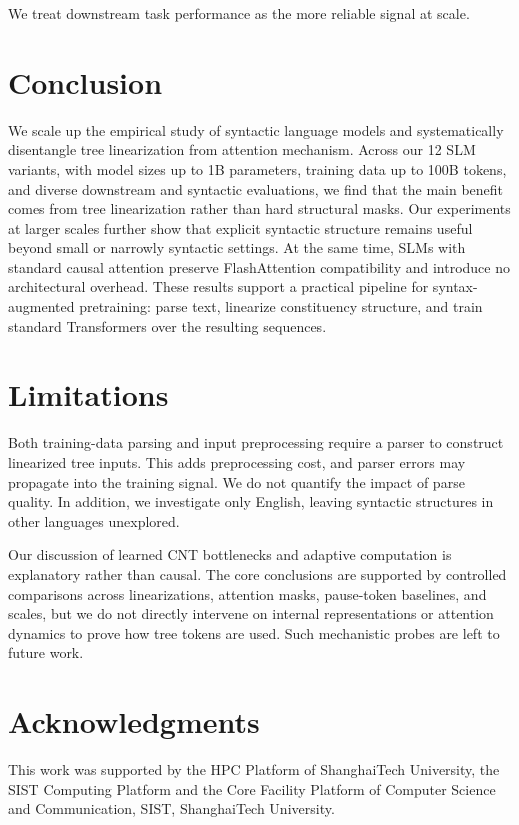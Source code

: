 \documentclass[11pt]{article}
\begin{document}
We treat downstream task performance as the more reliable signal at scale.

\section{Conclusion}

We scale up the empirical study of syntactic language models and systematically disentangle tree linearization from attention mechanism. Across our 12 SLM variants, with model sizes up to 1B parameters, training data up to 100B tokens, and diverse downstream and syntactic evaluations, we find that the main benefit comes from tree linearization rather than hard structural masks. Our experiments at larger scales further show that explicit syntactic structure remains useful beyond small or narrowly syntactic settings. At the same time, SLMs with standard causal attention preserve FlashAttention compatibility and introduce no architectural overhead. These results support a practical pipeline for syntax-augmented pretraining: parse text, linearize constituency structure, and train standard Transformers over the resulting sequences.



\section*{Limitations}

Both training-data parsing and input preprocessing require a parser to construct linearized tree inputs. This adds preprocessing cost, and parser errors may propagate into the training signal. We do not quantify the impact of parse quality. In addition, we investigate only English, leaving syntactic structures in other languages unexplored.

Our discussion of learned CNT bottlenecks and adaptive computation is explanatory rather than causal. The core conclusions are supported by controlled comparisons across linearizations, attention masks, pause-token baselines, and scales, but we do not directly intervene on internal representations or attention dynamics to prove how tree tokens are used. Such mechanistic probes are left to future work.

\section*{Acknowledgments}
This work was supported by the HPC Platform of ShanghaiTech University, the SIST Computing Platform and the Core Facility Platform of Computer Science and Communication, SIST, ShanghaiTech University. 
\end{document}
